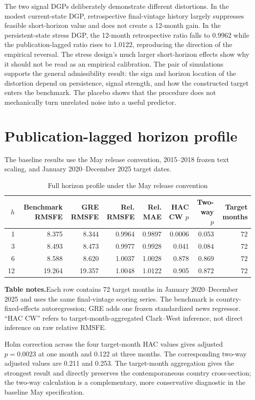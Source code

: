\documentclass[12pt]{article}
\newcommand{\TableNote}[1]{%
  \par\vspace{0.65ex}\noindent
  \begin{minipage}{0.97\linewidth}\footnotesize\singlespacing\raggedright
  \textbf{Table notes.}\enspace #1
  \end{minipage}}
\begin{document}
The two signal DGPs deliberately demonstrate different distortions. In the modest current-state DGP, retrospective final-vintage history largely suppresses feasible short-horizon value and does not create a 12-month gain. In the persistent-state stress DGP, the 12-month retrospective ratio falls to 0.9962 while the publication-lagged ratio rises to 1.0122, reproducing the direction of the empirical reversal. The stress design's much larger short-horizon effects show why it should not be read as an empirical calibration. The pair of simulations supports the general admissibility result: the sign and horizon location of the distortion depend on persistence, signal strength, and how the constructed target enters the benchmark. The placebo shows that the procedure does not mechanically turn unrelated noise into a useful predictor.


\section{Publication-lagged horizon profile}
The baseline results use the May release convention, 2015--2018 frozen text scaling, and January 2020--December 2025 target dates.
\begin{table}[htbp]
\centering\scriptsize
\caption{Full horizon profile under the May release convention}
\begin{tabular}{rrrrrrrr}
\toprule
$h$ & Benchmark RMSFE & GRE RMSFE & Rel. RMSFE & Rel. MAE & HAC CW $p$ & Two-way $p$ & Target months\\
\midrule
1 & 8.375 & 8.344 & 0.9964 & 0.9897 & 0.0006 & 0.053 & 72\\
3 & 8.493 & 8.473 & 0.9977 & 0.9928 & 0.041 & 0.084 & 72\\
6 & 8.588 & 8.620 & 1.0037 & 1.0028 & 0.878 & 0.869 & 72\\
12 & 19.264 & 19.357 & 1.0048 & 1.0122 & 0.905 & 0.872 & 72\\
\bottomrule
\end{tabular}
\TableNote{Each row contains 72 target months in January 2020--December 2025 and uses the same final-vintage scoring series. The benchmark is country-fixed-effects autoregression; GRE adds one frozen standardized news regressor. ``HAC CW'' refers to target-month-aggregated Clark--West inference, not direct inference on raw relative RMSFE.}
\end{table}

Holm correction across the four target-month HAC values gives adjusted $p=0.0023$ at one month and 0.122 at three months. The corresponding two-way adjusted values are 0.211 and 0.253. The target-month aggregation gives the strongest result and directly preserves the contemporaneous country cross-section; the two-way calculation is a complementary, more conservative diagnostic in the baseline May specification.
\end{document}
